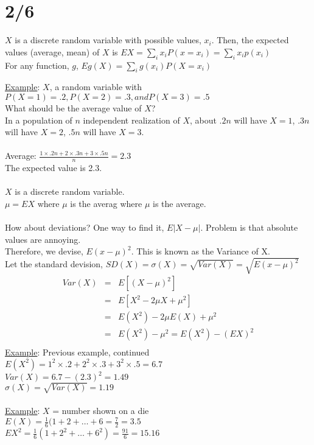 \section*{2/6}
  \begin{definition} $X$ is a discrete random variable with possible
  values, $x_i$. Then, the expected values (average, mean) of $X$ is
  $EX = \sum_i x_i P(x = x_i) = \sum_i x_i p(x_i)$\\
  For any function, $g$, $Eg(X) = \sum_i g(x_i) P(X = x_i)$
  \end{definition}
  \noindent\underline{Example}: $X$, a random variable with $P(X = 1) = .2, P(X=2)
    = .3, and P(X=3) = .5$\\
    What should be the average value of $X$?\\
    In a population of $n$ independent realization of $X$, about $.2n$ will
    have $X = 1$, $.3n$ will have $X = 2$, $.5n$ will have $X = 3$.\\\\
    Average: $\frac{1 \times .2n + 2 \times .3n + 3 \times .5n}{n} = 2.3$\\
    The expected value is 2.3.\\\\
    $X$ is a discrete random variable.\\
    $\mu = EX$ where $\mu$ is the averag where $\mu$ is the average.\\\\
    How about deviations? One way to find it, $E|X - \mu|$. Problem is that
    absolute values are annoying.\\
    Therefore, we devise, $E(x - \mu)^2$. This is known as the Variance of X.\\
    Let the standard devision, $SD(X) = \sigma(X) = \sqrt{Var(X)} = 
    \sqrt{E(x-\mu)^2}$\\
    \begin{eqnarray*}
      Var(X) & = & E[(X - \mu)^2]\\
        & = & E[X^2 - 2\mu X +\mu^2]\\
        & = & E(X^2) - 2\mu E(X) + \mu^2\\
        & = & E(X^2) - \mu^2 = E(X^2) - (EX)^2\\
    \end{eqnarray*}
  \underline{Example}: Previous example, continued\\
    $E(X^2) = 1^2 \times .2 + 2^2 \times .3 + 3^2 \times .5 = 6.7$\\
    $Var(X) = 6.7 - (2.3)^2 = 1.49$\\
    $\sigma(X) = \sqrt{Var(X)} = 1.19$\\\\
  \underline{Example}: $X$ = number shown on a die\\
    $E(X) = \frac{1}{6}(1 + 2 + \ldots + 6 = \frac{7}{2} = 3.5$\\
    $EX^2 = \frac{1}{6}(1 + 2^2 + \ldots + 6^2) = \frac{91}{6} = 15.16$\\\\
